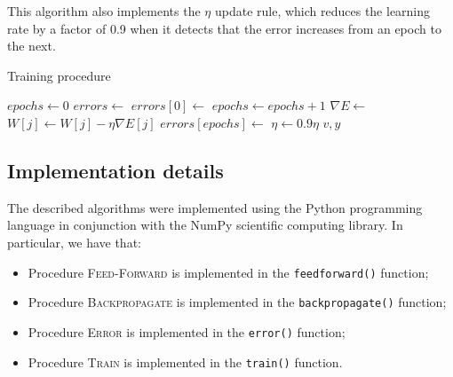 \documentclass[letterpaper,headings=standardclasses]{scrartcl}
\begin{document}
This algorithm also implements the $\eta$ update rule, which reduces the learning rate by a factor of 0.9 when it detects that the error increases from an epoch to the next.

\begin{algorithm}[h]
    \caption{Training procedure}
    \label{tralg}
    \begin{algorithmic}
    
        \State {}
        \State $epochs \gets 0$
        \State $errors \gets $ 
        \State $errors[0] \gets $ 
        \State {}
            \State $epochs \gets epochs + 1$
            \State {}
                \State $\nabla E \gets $ 
                    \State $W[j] \gets W[j] - \eta \nabla E[j]$
                \EndFor
            \EndFor
            \State {}
            \State $errors[epochs] \gets $ 
            \State {}
                \State $\eta \gets 0.9 \eta$
            \EndIf
        \EndWhile
        \State \Return $v, y$
    \EndFunction
    
    \end{algorithmic}
\end{algorithm}

\subsection{Implementation details}

The described algorithms were implemented using the Python programming language in conjunction with the NumPy scientific computing library. In particular, we have that:

\begin{itemize}
    \item Procedure \textsc{Feed-Forward} is implemented in the \texttt{feedforward()} function;
    \item Procedure \textsc{Backpropagate} is implemented in the \texttt{backpropagate()} function;
    \item Procedure \textsc{Error} is implemented in the \texttt{error()} function;
    \item Procedure \textsc{Train} is implemented in the \texttt{train()} function.
\end{itemize}
\end{document}

